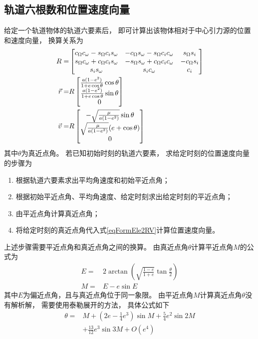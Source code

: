 \subsection{轨道六根数和位置速度向量}
给定一个轨道物体的轨道六要素后，
即可计算出该物体相对于中心引力源的位置和速度向量，
换算关系为
\begin{align}
    R =& \left[\begin{matrix}
        c_\Omega c_\omega-s_\Omega c_i s_\omega & -c_\Omega s_\omega-s_\Omega c_i c_\omega & s_\Omega s_i \\
        s_\Omega c_\omega+c_\Omega c_i s_\omega & -s_\Omega s_\omega+c_\Omega c_i c_\omega & -c_\Omega s_i \\
        s_i s_\omega & s_i c_\omega & c_i
    \end{matrix}\right] \notag\\
    \vec{r} =& R\left[\begin{matrix}
        \frac{a(1-e^2)}{1+e\cos\theta}\cos\theta \\ \frac{a(1-e^2)}{1+e\cos\theta}\sin\theta \\ 0
    \end{matrix}\right] \notag\\
    \vec{v} =& R\left[\begin{matrix}
        -\sqrt{\frac{\mu}{a(1-e^2)}}\sin\theta \\ \sqrt{\frac{\mu}{a(1-e^2)}}(e+\cos\theta) \\ 0
    \end{matrix}\right] \label{eqFormEle2RV}
\end{align}
其中$\theta$为真近点角。
若已知初始时刻的轨道六要素，
求给定时刻的位置速度向量的步骤为
\begin{enumerate}[label={(\arabic*)}]\setlength{\itemsep}{-5pt}
    \item 根据轨道六要素求出平均角速度和初始平近点角；
    \item 根据初始平近点角、平均角速度、给定时刻求出给定时刻的平近点角；
    \item 由平近点角计算真近点角；
    \item 将给定时刻的真近点角代入式\eqref{eqFormEle2RV}计算位置速度向量。
\end{enumerate}
上述步骤需要平近点角和真近点角之间的换算。
由真近点角$\theta$计算平近点角$M$的公式为
\begin{align*}
    E =& 2\arctan\left(\sqrt{\frac{1-e}{1+e}}\tan\frac{\theta}{2}\right) \\
    M =& E - e\sin{E}
\end{align*}
其中$E$为偏近点角，且与真近点角位于同一象限。
由平近点角$M$计算真近点角$\theta$没有解析解，
需要使用泰勒展开的方法，
具体公式如下\cite{msmart1977}
\begin{align*}
    \theta =& M+\left(2e-\frac{1}{4}e^3\right)\sin{M}
    + {\frac{5}{4}}e^2\sin{2M} \\
    &+ {\frac{13}{12}}e^3\sin{3M}+O(e^4)
\end{align*}

